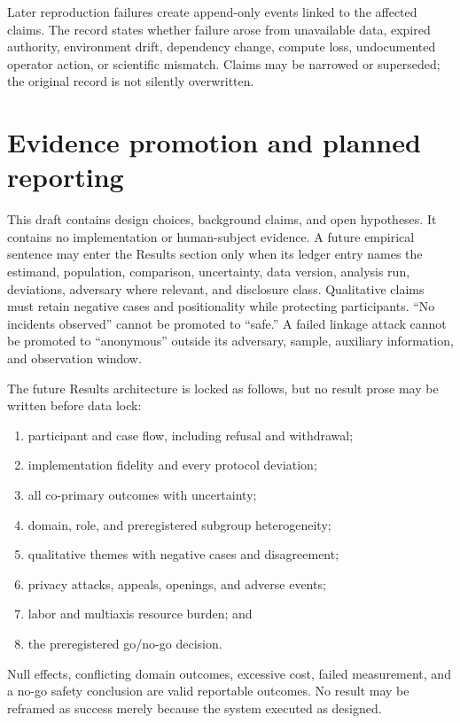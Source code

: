 \documentclass[11pt]{article}
\begin{document}
Later reproduction failures create append-only events linked to the affected
claims. The record states whether failure arose from unavailable data, expired
authority, environment drift, dependency change, compute loss, undocumented
operator action, or scientific mismatch. Claims may be narrowed or superseded;
the original record is not silently overwritten.

\section{Evidence promotion and planned reporting}

This draft contains design choices, background claims, and open hypotheses. It
contains no implementation or human-subject evidence. A future empirical sentence
may enter the Results section only when its ledger entry names the estimand,
population, comparison, uncertainty, data version, analysis run, deviations,
adversary where relevant, and disclosure class. Qualitative claims must retain
negative cases and positionality while protecting participants. ``No incidents
observed'' cannot be promoted to ``safe.'' A failed linkage attack cannot be
promoted to ``anonymous'' outside its adversary, sample, auxiliary information,
and observation window.

The future Results architecture is locked as follows, but no result prose may be
written before data lock:

\begin{enumerate}
  \item participant and case flow, including refusal and withdrawal;
  \item implementation fidelity and every protocol deviation;
  \item all co-primary outcomes with uncertainty;
  \item domain, role, and preregistered subgroup heterogeneity;
  \item qualitative themes with negative cases and disagreement;
  \item privacy attacks, appeals, openings, and adverse events;
  \item labor and multiaxis resource burden; and
  \item the preregistered go/no-go decision.
\end{enumerate}

Null effects, conflicting domain outcomes, excessive cost, failed measurement, and
a no-go safety conclusion are valid reportable outcomes. No result may be reframed
as success merely because the system executed as designed.
\end{document}
